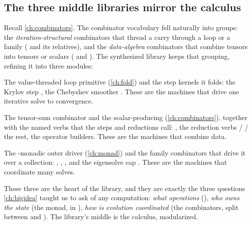 \subsection{The three middle libraries mirror the calculus}

{\sloppy
Recall \cref{ch:combinators}. The combinator vocabulary fell naturally into groups:
the \emph{iteration-structural} combinators that thread a carry through a loop or a
family ( and its relatives), and the \emph{data-algebra}
combinators that combine tensors into tensors or scalars (
and ). The synthesized library keeps that grouping, refining it
into three modules:\par}

\begingroup\sloppy
\begin{description}[style=nextline, leftmargin=0pt, font=\normalfont\itshape]
  \item[\code{iteration} --- iteration \& step combinators.] The value-threaded loop
  primitive  (\cref{ch:fold}) and the step kernels it folds:
  the Krylov step , the Chebyshev smoother .
  These are the machines that drive one iterative solve to convergence.
  \item[\code{data-algebra} --- data-combining verbs.] The tensor-sum combinator
   and the scalar-producing 
  (\cref{ch:combinators}), together with the named verbs that the steps and
  reductions call: , the reduction verbs  /
   / the rest, the operator builders. These are the
  machines that combine data.
  \item[\code{coordination} --- outer-driver caps \& coordination.] The
  -monadic outer driver  (\cref{ch:monad}) and the
  family combinators that drive it over a collection: ,
  , , and the eigensolve cap
  . These are the machines that coordinate many solves.
\end{description}
\endgroup

These three are the heart of the library, and they are exactly the three questions
\cref{ch:bigidea} taught us to ask of any computation: \emph{what operations}
(), \emph{who owns the state} (the  monad, in
), \emph{how is evolution coordinated} (the combinators, split
between  and ). The library's middle is the
calculus, modularized.

